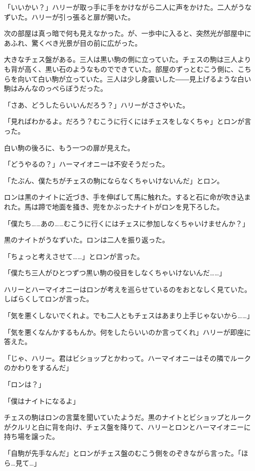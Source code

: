 \documentclass[10pt,a4paper]{article}
\begin{document}
\begin{CJK}{UTF8}{min}
「いいかい？」ハリーが取っ手に手をかけながら二人に声をかけた。二人がうなずいた。ハリーが引っ張ると扉が開いた。

次の部屋は真っ暗で何も見えなかった。が、一歩中に入ると、突然光が部屋中にあふれ、驚くべき光景が目の前に広がった。

大きなチェス盤がある。三人は黒い駒の側に立っていた。チェスの駒は三人よりも背が高く、黒い石のようなものでできていた。部屋のずっとむこう側に、こちらを向いて白い駒が立っていた。三人は少し身震いした――見上げるような白い駒はみんなのっぺらぼうだった。

「さあ、どうしたらいいんだろう？」ハリーがささやいた。

「見ればわかるよ。だろう？むこうに行くにはチェスをしなくちゃ」とロンが言った。

白い駒の後ろに、もう一つの扉が見えた。

「どうやるの？」ハーマイオニーは不安そうだった。

「たぶん、僕たちがチェスの駒にならなくちゃいけないんだ」とロン。

ロンは黒のナイトに近づき、手を伸ばして馬に触れた。すると石に命が吹き込まれた。馬は蹄で地面を掻き、兜をかぶったナイトがロンを見下ろした。

「僕たち……あの……むこうに行くにはチェスに参加しなくちゃいけませんか？」

黒のナイトがうなずいた。ロンは二人を振り返った。

「ちょっと考えさせて……」とロンが言った。

「僕たち三人がひとつずつ黒い駒の役目をしなくちゃいけないんだ……」

ハリーとハーマイオニーはロンが考えを巡らせているのをおとなしく見ていた。しばらくしてロンが言った。

「気を悪くしないでくれよ。でも二人ともチェスはあまり上手じゃないから……」

「気を悪くなんかするもんか。何をしたらいいのか言ってくれ」ハリーが即座に答えた。

「じゃ、ハリー。君はビショップとかわって。ハーマイオニーはその隣でルークのかわりをするんだ」

「ロンは？」

「僕はナイトになるよ」

チェスの駒はロンの言葉を聞いていたようだ。黒のナイトとビショップとルークがクルリと白に背を向け、チェス盤を降りて、ハリーとロンとハーマイオニーに持ち場を譲った。

「自駒が先手なんだ」とロンがチェス盤のむこう側をのぞきながら言った。「ほら…見て…」


\end{CJK}
\end{document}
